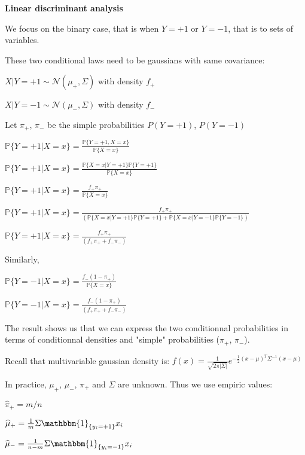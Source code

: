 {\fontsize{12pt}{22pt} \textbf{Linear discriminant analysis}\par}

\vspace{5mm}

We focus on the binary case, that is when $Y=+1$ or $Y=-1$, that is to sets of variables.

These two conditional laws need to be gaussians with same covariance: \vspace{1mm}

$X | Y=+1 \sim \mathcal{N}(\mu_+,\Sigma)$ with density $f_+$

$X | Y=-1 \sim \mathcal{N}(\mu_-,\Sigma)$ with density $f_-$

Let $\pi_+$, $\pi_-$ be the simple probabilities $P(Y=+1)$, $P(Y=-1)$\vspace{3mm}

$ \mathbb{P}\{Y=+1|X=x\} = \frac{\mathbb{P}\{Y=+1, X=x\}}{\mathbb{P}\{X=x\}}$

$ \mathbb{P}\{Y=+1|X=x\} = \frac{\mathbb{P}\{X=x|Y=+1\} \mathbb{P}\{Y=+1\} }{\mathbb{P}\{X=x\} }$

$ \mathbb{P}\{Y=+1|X=x\} = \frac{f_+ \pi_+}{\mathbb{P}\{X=x\} }$

$ \mathbb{P}\{Y=+1|X=x\} = \frac{f_+ \pi_+}{(\mathbb{P}\{X=x|Y=+1\}\mathbb{P}\{Y= +1\} + \mathbb{P}\{X=x|Y=-1\}\mathbb{P}\{Y= -1\}) }$

$\mathbb{P}\{Y=+1|X=x\} = \frac{f_+ \pi_+}{(f_+\pi_+ + f_-\pi_-)}$

Similarly,

$ \mathbb{P}\{Y=-1|X=x\} = \frac{f_- (1-\pi_+)}{\mathbb{P}\{X=x\} }$

$\mathbb{P}\{Y=-1|X=x\} = \frac{f_- (1-\pi_+)}{(f_+\pi_+ + f_-\pi_-)}$

\vspace{3mm}

The result shows us that we can express the two conditionnal probabilities in terms of conditionnal densities and "simple" probabilities ($\pi_+$, $\pi_-$).

Recall that multivariable gaussian density is: $f(x)=\frac{1}{\sqrt{2 \pi |\Sigma|}}e^{-\frac{1}{2}(x-\mu)^T\Sigma^{-1}(x-\mu)}$

In practice, $\mu_+$, $\mu_-$, $\pi_+$ and $\Sigma$ are unknown. Thus we use empiric values:

$\widehat{\pi}_+ = m/n$

$\widehat{\mu}_+ = \frac{1}{m} \Sigma \mathbbm{1}_{\{y_i=+1\}}x_i$

$\widehat{\mu}_- = \frac{1}{n-m} \Sigma \mathbbm{1}_{\{y_i=-1\}}x_i$

